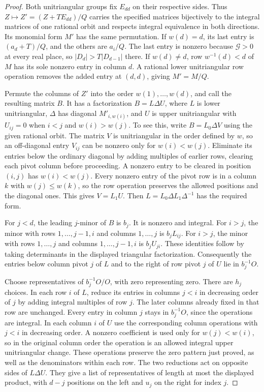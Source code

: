 \documentclass[a4paper,11pt]{article}
\theoremstyle{definition}
\theoremstyle{remark}
\numberwithin{equation}{section}
\begin{document}
\begin{proof}
Both unitriangular groups fix \(E_{dd}\) on their respective
sides. Thus \(Z\mapsto Z'=(Z+TE_{dd})/Q\) carries the
specified matrices bijectively to the integral matrices of
one rational orbit and respects integral equivalence in both
directions. Its monomial form \(M'\) has the same permutation.
If \(w(d)=d\), its last entry is \((a_d+T)/Q\), and the
others are \(a_i/Q\). The last entry is nonzero because
\(\mathcal G>0\) at every real place, so
\(|D_d|>T|D_{d-1}|\) there. If \(w(d)\ne d\), row
\(w^{-1}(d)<d\) of \(M\) has its sole nonzero entry in column
\(d\). A rational lower unitriangular row operation removes
the added entry at \((d,d)\), giving \(M'=M/Q\).

Permute the columns of \(Z'\) into the order
\(w(1),\ldots,w(d)\), and call the resulting matrix \(B\).
It has a factorization \(B=L\Delta U\), where \(L\) is lower
unitriangular, \(\Delta\) has diagonal \(M'_{i,w(i)}\), and
\(U\) is upper unitriangular with \(U_{ij}=0\) when
\(i<j\) and \(w(i)>w(j)\). To see this, write
\(B=L_0\Delta V\) using the given rational orbit. The
matrix \(V\) is unitriangular in the order defined by \(w\),
so an off-diagonal entry \(V_{ij}\) can be nonzero only for
\(w(i)<w(j)\). Eliminate its entries below the ordinary
diagonal by adding multiples of earlier rows, clearing each
pivot column before proceeding. A nonzero entry to be
cleared in position \((i,j)\) has \(w(i)<w(j)\). Every
nonzero entry of the pivot row is in a column \(k\) with
\(w(j)\le w(k)\), so the row operation preserves the allowed
positions and the diagonal ones. This gives \(V=L_1U\).
Then \(L=L_0\Delta L_1\Delta^{-1}\) has the required form.

For \(j<d\), the leading \(j\)-minor of \(B\) is \(b_j\).
It is nonzero and integral. For \(i>j\), the minor with
rows \(1,\ldots,j-1,i\) and columns \(1,\ldots,j\) is
\(b_jL_{ij}\). For \(i>j\), the minor with rows
\(1,\ldots,j\) and columns \(1,\ldots,j-1,i\) is
\(b_jU_{ji}\). These identities follow by taking determinants
in the displayed triangular factorization. Consequently
the entries below column pivot \(j\) of \(L\) and to the
right of row pivot \(j\) of \(U\) lie in \(b_j^{-1}O\).

Choose representatives of \(b_j^{-1}O/O\), with zero
representing zero. There are \(h_j\) choices. In each row
\(i\) of \(L\), reduce its entries in columns \(j<i\)
in decreasing order of \(j\) by adding integral multiples
of row \(j\). The later columns already fixed in that row
are unchanged. Every entry in column \(j\) stays in
\(b_j^{-1}O\), since the operations are integral.
In each column \(i\) of \(U\) use the corresponding column
operations with \(j<i\) in decreasing order. A nonzero
coefficient is used only for \(w(j)<w(i)\), so in the
original column order the operation is an allowed integral
upper unitriangular change. These operations preserve the
zero pattern just proved, as well as the denominators within
each row. The two reductions act on opposite sides of
\(L\Delta U\). They give a list of representatives of length
at most the displayed product, with \(d-j\) positions on
the left and \(u_j\) on the right for index \(j\).


\end{proof}
\end{document}
